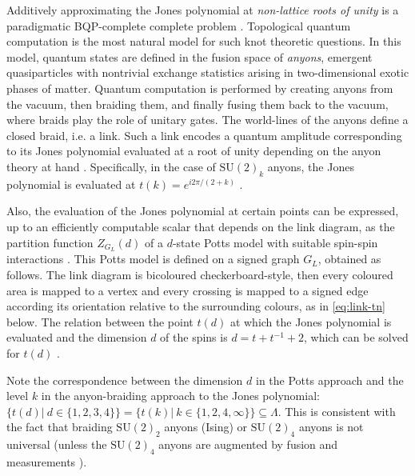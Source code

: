 Additively approximating the Jones polynomial at \emph{non-lattice roots of unity} is a paradigmatic BQP-complete complete problem \cite{Aharonov_2008,kuperberg2014hard}.
Topological quantum computation \cite{Freedman2002,pachos_2012} is the most natural model for such knot theoretic questions. In this model, quantum states are defined in the fusion space of \emph{anyons}, emergent quasiparticles with nontrivial exchange statistics arising in two-dimensional exotic phases of matter.
Quantum computation is performed by creating anyons from the vacuum, then braiding them, and finally fusing them back to the vacuum, where braids play the role of unitary gates.
The world-lines of the anyons define a closed braid, i.e. a link.
Such a link encodes a quantum amplitude corresponding to its Jones polynomial evaluated at a root of unity depending on the anyon theory at hand \cite{Witten1989}. 
Specifically, in the case of $\text{SU}(2)_k$ anyons, the Jones polynomial is evaluated at $t(k) = e^{i 2\pi/(2+k)}$ \cite{Rowell_2018}.

Also, the evaluation of the Jones polynomial at certain points can be expressed, up to an efficiently computable scalar that depends on the link diagram, as the partition function $Z_{G_L}(d)$ of a $d$-state Potts model with suitable spin-spin interactions \cite{RevModPhys.64.1099}.
This Potts model is defined on a signed graph $G_L$, obtained as follows.
The link diagram is bicoloured checkerboard-style,
then every coloured area is mapped to a vertex and every crossing is mapped to a signed edge according
its orientation relative to the surrounding colours, as in \eqref{eq:link-tn} below. 
The relation between the point $t(d)$ at which the Jones polynomial is evaluated and the dimension $d$ of the spins is $d = t + t^{-1} +2$,
which can be solved for $t(d)$ \cite{PhysRevE.100.033303}.

Note the correspondence between the dimension $d$ in the Potts approach and the level $k$ in the anyon-braiding approach to the Jones polynomial: $\{t(d) | ~ d \in\{1,2,3,4\} \} = \{ t(k) | ~ k\in\{1,2,4,\infty\} \} \subseteq \Lambda$.
This is consistent with the fact that braiding $\text{SU}(2)_2$ anyons (Ising) or $\text{SU}(2)_4$ anyons is not universal (unless the $\text{SU}(2)_4$ anyons are augmented by fusion and measurements \cite{Levaillant_2015}).

